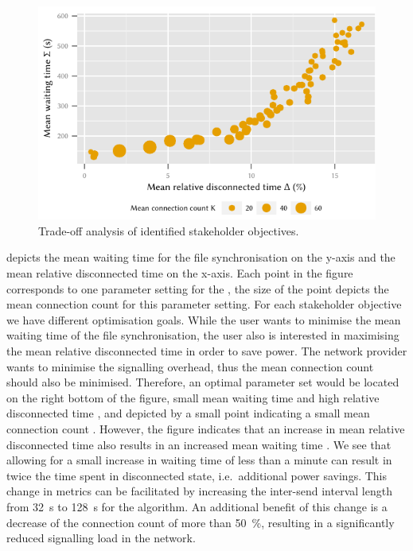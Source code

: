 \begin{figure}
  \centering
  \includegraphics{application/cloud_file_synchronization/numerical_evaluation/figures/summary}
  \caption{Trade-off analysis of identified stakeholder objectives.}
  \label{fig:application:cloud_file_synchronisation:numerical_evaluation:trade_off_analysis:summary}
\end{figure}

 depicts the mean waiting time for the file synchronisation on the y-axis and the mean relative disconnected time on the x-axis.
Each point in the figure corresponds to one parameter setting for the \algointerval, the size of the point depicts the mean connection count \connectionCount for this parameter setting.
For each stakeholder objective we have different optimisation goals.
While the user wants to minimise the mean waiting time \sojournTime of the file synchronisation, the user also is interested in maximising the mean relative disconnected time \relativeDisconnectedTime in order to save power.
The network provider wants to minimise the signalling overhead, thus the mean connection count \connectionCount should also be minimised.
Therefore, an optimal parameter set would be located on the right bottom of the figure, small mean waiting time and high relative disconnected time \relativeDisconnectedTime, and depicted by a small point indicating a small mean connection count \connectionCount.
However, the figure indicates that an increase in mean relative disconnected \relativeDisconnectedTime time also results in an increased mean waiting time \sojournTime.
We see that allowing for a small increase in waiting time \sojournTime of less than a minute can result in twice the time spent in disconnected state, i.e.\ additional power savings.
This change in metrics can be facilitated by increasing the inter-send interval length from \SI{32}{\second} to \SI{128}{\second} for the \algointerval algorithm.
An additional benefit of this change is a decrease of the connection count \relativeDisconnectedTime of more than \SI{50}{\percent}, resulting in a significantly reduced signalling load in the network.
